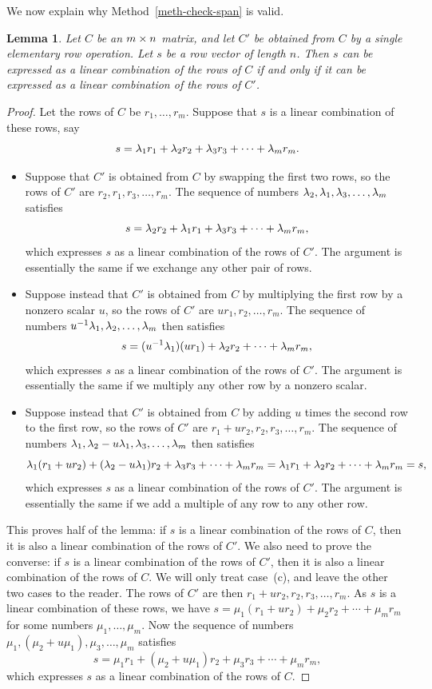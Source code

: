 \documentclass[reqno]{amsart}
\newtheorem{lemma}[theorem]{Lemma}
\theoremstyle{definition}
\begin{document}
We now explain why Method~\ref{meth-check-span} is valid.
\begin{lemma}\label{lem-span-invariant}
 Let $C$ be an $m\times n$ matrix, and let $C'$ be obtained from $C$ by a
 single elementary row operation.  Let $s$ be a row vector of length
 $n$.  Then $s$ can be expressed as a linear combination of the rows
 of $C$ if and only if it can be expressed as a linear combination of
 the rows of $C'$.
\end{lemma}
\begin{proof}
 Let the rows of $C$ be $r_1,\dotsc,r_m$.  Suppose that $s$ is a
 linear combination of these rows, say
 \[ s=\lambda_1r_1+\lambda_2r_2+\lambda_3r_3+\dotsb+\lambda_mr_m. \]
 \begin{itemize}
  \item[(a)] Suppose that $C'$ is obtained from $C$ by swapping the
   first two rows, so the rows of $C'$ are $r_2,r_1,r_3,\dotsc,r_m$.
   The sequence of numbers $\lambda_2,\lambda_1,\lambda_3,\dotsc,\lambda_m$ satisfies
   \[ s=\lambda_2r_2+\lambda_1r_1+\lambda_3r_3+\dotsb+\lambda_mr_m, \]
   which expresses $s$ as a linear combination of the rows of $C'$.  The
   argument is essentially the same if we exchange any other pair of
   rows.
  \item[(b)] Suppose instead that $C'$ is obtained from $C$ by
   multiplying the first row by a nonzero scalar $u$, so the rows of
   $C'$ are $ur_1,r_2,\dotsc,r_m$.  The sequence of numbers
   $u^{-1}\lambda_1,\lambda_2,\dotsc,\lambda_m$ then satisfies
   \[ s = (u^{-1}\lambda_1)(ur_1)+\lambda_2r_2+\dotsb+\lambda_mr_m, \]
   which expresses $s$ as a linear combination of the rows of $C'$.  The
   argument is essentially the same if we multiply any other row by a
   nonzero scalar.
  \item[(c)] Suppose instead that $C'$ is obtained from $C$ by adding
   $u$ times the second row to the first row, so the rows of $C'$ are
   $r_1+ur_2,r_2,r_3,\dotsc,r_m$.  The sequence of numbers
   $\lambda_1,\lambda_2-u\lambda_1,\lambda_3,\dotsc,\lambda_m$ then satisfies
   \[ \lambda_1(r_1+ur_2)+(\lambda_2-u\lambda_1)r_2+\lambda_3r_3+\dotsb+\lambda_mr_m =
       \lambda_1r_1+\lambda_2r_2+\dotsb+\lambda_mr_m=s,
   \]
   which expresses $s$ as a linear combination of the rows of $C'$.  The
   argument is essentially the same if we add a multiple of any row to
   any other row.
 \end{itemize}
 This proves half of the lemma: if $s$ is a linear combination of the
 rows of $C$, then it is also a linear combination of the rows of
 $C'$.  We also need to prove the converse: if $s$ is a linear
 combination of the rows of $C'$, then it is also a linear combination
 of the rows of $C$.  We will only treat case~(c), and leave the other
 two cases to the reader.  The rows of $C'$ are then
 $r_1+ur_2,r_2,r_3,\dotsc,r_m$.  As $s$ is a linear combination of
 these rows, we have $s=\mu_1(r_1+ur_2)+\mu_2r_2+\dotsb+\mu_mr_m$ for
 some numbers $\mu_1,\dotsc,\mu_m$.  Now the sequence of numbers
 $\mu_1,(\mu_2+u\mu_1),\mu_3,\dotsc,\mu_m$ satisfies
 \[ s = \mu_1r_1+(\mu_2+u\mu_1)r_2+\mu_3r_3+\dotsb+\mu_mr_m, \]
 which expresses $s$ as a linear combination of the rows of $C$.
\end{proof}
\end{document}
